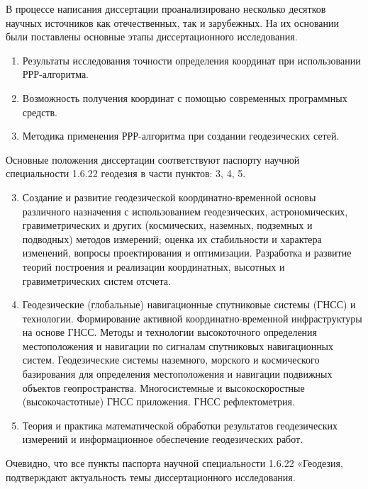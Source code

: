 {\methods}

В процессе написания диссертации проанализировано несколько десятков научных источников как отечественных, так и зарубежных. На их основании были поставлены основные этапы диссертационного исследования.

{}
\begin{enumerate}[beginpenalty=10000] %
	\item Результаты исследования точности определения координат при использовании РРР-алгоритма.
	\item Возможность получения координат с помощью современных программных средств.
	\item Методика применения РРР-алгоритма при создании геодезических сетей.
\end{enumerate}

{\pasport}
Основные положения диссертации соответствуют паспорту научной специальности 1.6.22 геодезия в части пунктов: 3, 4, 5.

\begin{enumerate}
	\setcounter{enumi}{2}
	\item Создание и развитие геодезической координатно-временной основы различного назначения с использованием геодезических, астрономических, гравиметрических и других (космических, наземных, подземных и подводных) методов измерений; оценка их стабильности и характера изменений, вопросы проектирования и оптимизации. Разработка и развитие теорий построения и реализации координатных, высотных и гравиметрических систем отсчета.
	\item Геодезические (глобальные) навигационные спутниковые системы (ГНСС) и технологии. Формирование активной координатно-временной инфраструктуры на основе ГНСС. Методы и технологии высокоточного определения местоположения и навигации по сигналам спутниковых навигационных систем. Геодезические системы наземного, морского и космического базирования для определения местоположения и навигации подвижных объектов геопространства. Многосистемные и высокоскоростные (высокочастотные) ГНСС приложения. ГНСС рефлектометрия. 
	\item Теория и практика математической обработки результатов геодезических измерений и информационное обеспечение геодезических работ.
\end{enumerate}

Очевидно, что все пункты паспорта научной специальности 1.6.22 «Геодезия, подтверждают актуальность темы диссертационного исследования.

